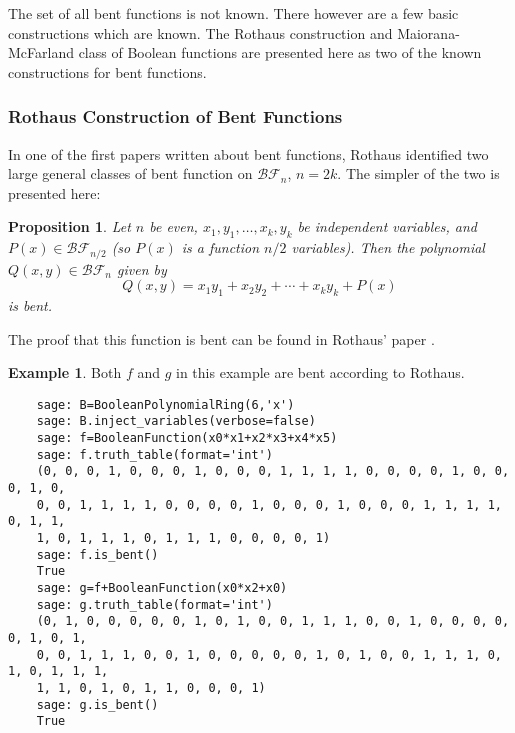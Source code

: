 \documentclass[english]{article}
\def\BF{\mathcal{BF}}
\theoremstyle{plain}
\newtheorem{proposition}[theorem]{Proposition}%
\theoremstyle{definition}
\newtheorem{example}[theorem]{Example}
\theoremstyle{remark}
\begin{document}

\par The set of all bent functions is not known. There however are a few basic
constructions which are known. The Rothaus construction and Maiorana-McFarland class of Boolean
functions are presented here as two of the known constructions for bent
functions.

\subsubsection{Rothaus Construction of Bent Functions}
\par In one of the first papers written about bent functions, Rothaus identified
two large general classes of bent function on $\BF_n$, $n=2k$. The simpler of
the two is presented here:
\begin{proposition}
  Let $n$ be even, $x_1,y_1,\dots,x_k,y_k$ be independent variables, and
  $P(x)\in\BF_{n/2}$ (so $P(x)$ is a function $n/2$ variables). Then the polynomial
  $Q(x,y)\in\BF_{n}$ given by
  \begin{equation}
    Q(x,y)=x_1y_1+x_2y_2+\cdots+x_ky_k+P(x)
  \end{equation}
  is bent.
\end{proposition}
\par The proof that this function is bent can be found in Rothaus' paper
\cite{art:r76}.

\begin{example}
  \par Both $f$ and $g$ in this example are bent according to Rothaus.
  \begin{lstlisting}
    sage: B=BooleanPolynomialRing(6,'x')
    sage: B.inject_variables(verbose=false)
    sage: f=BooleanFunction(x0*x1+x2*x3+x4*x5)
    sage: f.truth_table(format='int')
    (0, 0, 0, 1, 0, 0, 0, 1, 0, 0, 0, 1, 1, 1, 1, 0, 0, 0, 0, 1, 0, 0, 0, 1, 0,
    0, 0, 1, 1, 1, 1, 0, 0, 0, 0, 1, 0, 0, 0, 1, 0, 0, 0, 1, 1, 1, 1, 0, 1, 1,
    1, 0, 1, 1, 1, 0, 1, 1, 1, 0, 0, 0, 0, 1)
    sage: f.is_bent()
    True
    sage: g=f+BooleanFunction(x0*x2+x0)
    sage: g.truth_table(format='int')
    (0, 1, 0, 0, 0, 0, 0, 1, 0, 1, 0, 0, 1, 1, 1, 0, 0, 1, 0, 0, 0, 0, 0, 1, 0, 1,
    0, 0, 1, 1, 1, 0, 0, 1, 0, 0, 0, 0, 0, 1, 0, 1, 0, 0, 1, 1, 1, 0, 1, 0, 1, 1, 1,
    1, 1, 0, 1, 0, 1, 1, 0, 0, 0, 1)
    sage: g.is_bent()
    True
  \end{lstlisting}
\end{example}
\end{document}
